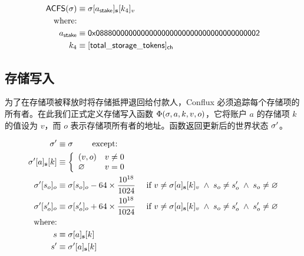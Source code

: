 \begin{align}
	\mathsf{ACFS}(\st) &\eqdef \st[a_{\sf stake}]_{\bf s}[k_4]_v\\
	\mbox{where:} & \\
	a_{\sf stake} &\eqdef \stakingcontract \\ 
	k_4 &\eqdef {\sf [total\char`_storage\char`_tokens]_{\sf ch}} 
\end{align}

\subsection{存储写入}\label{sec:storage_maintain}

为了在存储项被释放时将存储抵押退回给付款人，Conflux 必须追踪每个存储项的所有者。在此我们正式定义存储写入函数 $\Phi(\mathbf{\sigma},a,k,v,o)$，它将账户 $a$ 的存储项 $k$ 的值设为 $v$，而 $o$ 表示存储项所有者的地址。函数返回更新后的世界状态 $\mathbf{\sigma}'$。

\begin{align}
	\mathbf{\sigma}'   &\equiv \mathbf{\sigma} \qquad \mbox{  except:}\\ 
	\mathbf{\sigma}'[a]_{\bf s}[k] &\equiv\left\{
		\begin{array}{ll}
			(v,o) & v\neq 0\\
			\varnothing & v= 0\\
		\end{array}
	\right.\\
	\mathbf{\sigma}'[s_o]_o &\equiv \mathbf{\sigma}[s_o]_o - 64 \times \frac{10^{18}}{1024} \quad \mbox{ if } v\neq \mathbf{\sigma}[a]_{\bf s}[k]_v \;\wedge\; s_o\neq s'_o \;\wedge\; s_o\neq\varnothing \\ 
	\mathbf{\sigma}'[s'_o]_o &\equiv \mathbf{\sigma}[s'_o]_o + 64 \times \frac{10^{18}}{1024} \quad \mbox{ if }v\neq \mathbf{\sigma}[a]_{\bf s}[k]_v \;\wedge\; s_o\neq s'_o \;\wedge\; s'_o\neq\varnothing \\ 
	\text{where:} & \\
	s &\equiv \mathbf{\sigma}[a]_{\bf s}[k] \\
	s' &\equiv \mathbf{\sigma}'[a]_{\bf s}[k] 
\end{align}

